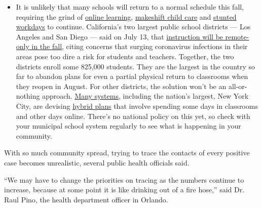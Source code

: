 \begin{itemize}
  \begin{itemize}
  \tightlist
  \item
    It is unlikely that many schools will return to a normal schedule
    this fall, requiring the grind of
    \href{https://www.nytimes.com/2020/06/05/us/coronavirus-education-lost-learning.html?action=click\&pgtype=Article\&state=default\&region=MAIN_CONTENT_3\&context=storylines_faq}{online
    learning},
    \href{https://www.nytimes.com/2020/05/29/us/coronavirus-child-care-centers.html?action=click\&pgtype=Article\&state=default\&region=MAIN_CONTENT_3\&context=storylines_faq}{makeshift
    child care} and
    \href{https://www.nytimes.com/2020/06/03/business/economy/coronavirus-working-women.html?action=click\&pgtype=Article\&state=default\&region=MAIN_CONTENT_3\&context=storylines_faq}{stunted
    workdays} to continue. California's two largest public school
    districts --- Los Angeles and San Diego --- said on July 13, that
    \href{https://www.nytimes.com/2020/07/13/us/lausd-san-diego-school-reopening.html?action=click\&pgtype=Article\&state=default\&region=MAIN_CONTENT_3\&context=storylines_faq}{instruction
    will be remote-only in the fall}, citing concerns that surging
    coronavirus infections in their areas pose too dire a risk for
    students and teachers. Together, the two districts enroll some
    825,000 students. They are the largest in the country so far to
    abandon plans for even a partial physical return to classrooms when
    they reopen in August. For other districts, the solution won't be an
    all-or-nothing approach.
    \href{https://bioethics.jhu.edu/research-and-outreach/projects/eschool-initiative/school-policy-tracker/}{Many
    systems}, including the nation's largest, New York City, are
    devising
    \href{https://www.nytimes.com/2020/06/26/us/coronavirus-schools-reopen-fall.html?action=click\&pgtype=Article\&state=default\&region=MAIN_CONTENT_3\&context=storylines_faq}{hybrid
    plans} that involve spending some days in classrooms and other days
    online. There's no national policy on this yet, so check with your
    municipal school system regularly to see what is happening in your
    community.
  \end{itemize}
\end{itemize}

With so much community spread, trying to trace the contacts of every
positive case becomes unrealistic, several public health officials said.

``We may have to change the priorities on tracing as the numbers
continue to increase, because at some point it is like drinking out of a
fire hose,'' said Dr. Raul Pino, the health department officer in
Orlando.

